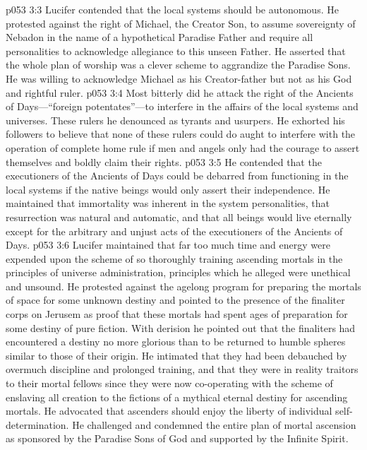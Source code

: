 \pc \vs p053 3:3 \bibnobreakspace {} Lucifer contended that the local systems should be autonomous. He protested against the right of Michael, the Creator Son, to assume sovereignty of Nebadon in the name of a hypothetical Paradise Father and require all personalities to acknowledge allegiance to this unseen Father. He asserted that the whole plan of worship was a clever scheme to aggrandize the Paradise Sons. He was willing to acknowledge Michael as his Creator\hyp{}father but not as his God and rightful ruler.
\vs p053 3:4 Most bitterly did he attack the right of the Ancients of Days---“foreign potentates”---to interfere in the affairs of the local systems and universes. These rulers he denounced as tyrants and usurpers. He exhorted his followers to believe that none of these rulers could do aught to interfere with the operation of complete home rule if men and angels only had the courage to assert themselves and boldly claim their rights.
\vs p053 3:5 He contended that the executioners of the Ancients of Days could be debarred from functioning in the local systems if the native beings would only assert their independence. He maintained that immortality was inherent in the system personalities, that resurrection was natural and automatic, and that all beings would live eternally except for the arbitrary and unjust acts of the executioners of the Ancients of Days.
\pc \vs p053 3:6 \bibnobreakspace {} Lucifer maintained that far too much time and energy were expended upon the scheme of so thoroughly training ascending mortals in the principles of universe administration, principles which he alleged were unethical and unsound. He protested against the agelong program for preparing the mortals of space for some unknown destiny and pointed to the presence of the finaliter corps on Jerusem as proof that these mortals had spent ages of preparation for some destiny of pure fiction. With derision he pointed out that the finaliters had encountered a destiny no more glorious than to be returned to humble spheres similar to those of their origin. He intimated that they had been debauched by overmuch discipline and prolonged training, and that they were in reality traitors to their mortal fellows since they were now co\hyp{}operating with the scheme of enslaving all creation to the fictions of a mythical eternal destiny for ascending mortals. He advocated that ascenders should enjoy the liberty of individual self\hyp{}determination. He challenged and condemned the entire plan of mortal ascension as sponsored by the Paradise Sons of God and supported by the Infinite Spirit.
